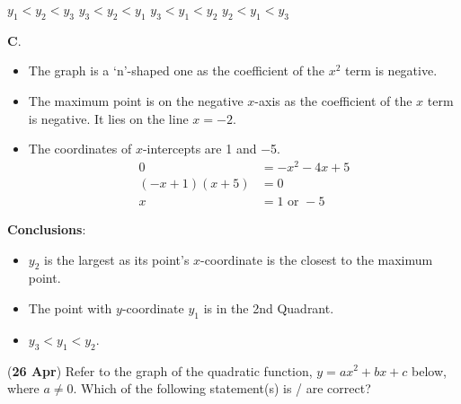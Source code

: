 \documentclass[12pt, answers]{exam}
\begin{document}
\begin{questions}
	\begin{oneparchoices}
		\choice \(y_{1} < y_{2} < y_{3}\)
		\choice \(y_{3} < y_{2} < y_{1}\)
		\choice \(y_{3} < y_{1} < y_{2}\)
		\choice \(y_{2} < y_{1} < y_{3}\)
	\end{oneparchoices}
	\begin{solution}
		\textbf{C}.
		\begin{itemize}
			\item The graph is a `n'-shaped one as the coefficient of the \(x^{2}\) term is negative.
			\item The maximum point is on the negative \(x\)-axis as the coefficient of the \(x\) term is negative. It lies on the line \(x = -2\).
			\item The coordinates of \(x\)-intercepts are \num{1} and \num{-5}.
			      \begin{align*}
				      0               & = -x^{2} - 4x + 5  \\
				      (-x + 1)(x + 5) & = 0                \\
				      x               & = 1 \text{ or } -5
			      \end{align*}
		\end{itemize}
		\textbf{Conclusions}:
		\begin{itemize}
			\item \(y_{2}\) is the largest as its point's \(x\)-coordinate is the closest to the maximum point.
			\item The point with \(y\)-coordinate \(y_{1}\) is in the 2nd Quadrant.
			\item \(y_{3} < y_{1} < y_{2}\).
		\end{itemize}
	\end{solution}

	\question (\textbf{26 Apr}) Refer to the graph of the quadratic function, \(y = ax^2 + bx + c \) below,
	where \(a \neq 0\). Which of the following statement(s) is / are correct?
	\begin{figure}[htpb]
		\centering
	\end{figure}


\end{questions}
\end{document}
